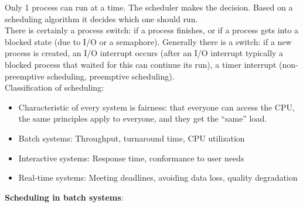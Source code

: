 \documentclass[margin=0px]{article}
\begin{document}
Only 1 process can run at a time. The scheduler makes the decision. Based on a scheduling algorithm it decides which one should run. \\
There is certainly a process switch: if a process finishes, or if a process gets into a blocked state (due to I/O or a semaphore). Generally there is a switch: if a new process is created, an I/O interrupt occurs (after an I/O interrupt typically a blocked process that waited for this can continue its run), a timer interrupt (non-preemptive scheduling, preemptive scheduling). \\
Classification of scheduling:
\begin{itemize}
    \item Characteristic of every system is fairness: that everyone can access the CPU, the same principles apply to everyone, and they get the ``same'' load.
    \item Batch systems: Throughput, turnaround time, CPU utilization
    \item Interactive systems: Response time, conformance to user needs
    \item Real-time systems: Meeting deadlines, avoiding data loss, quality degradation
\end{itemize}
\textbf{Scheduling in batch systems}:
\end{document}
